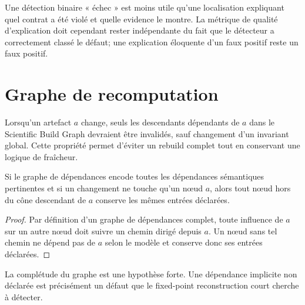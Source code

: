 Une détection binaire « échec » est moins utile qu'une localisation expliquant quel contrat a été violé et quelle evidence le montre. La métrique de qualité d'explication doit cependant rester indépendante du fait que le détecteur a correctement classé le défaut; une explication éloquente d'un faux positif reste un faux positif.

\section{Graphe de recomputation}

Lorsqu'un artefact $a$ change, seuls les descendants dépendants de $a$ dans le Scientific Build Graph devraient être invalidés, sauf changement d'un invariant global. Cette propriété permet d'éviter un rebuild complet tout en conservant une logique de fraîcheur.

\begin{proposition}
Si le graphe de dépendances encode toutes les dépendances sémantiques pertinentes et si un changement ne touche qu'un nœud $a$, alors tout nœud hors du cône descendant de $a$ conserve les mêmes entrées déclarées.
\end{proposition}

\begin{proof}
Par définition d'un graphe de dépendances complet, toute influence de $a$ sur un autre nœud doit suivre un chemin dirigé depuis $a$. Un nœud sans tel chemin ne dépend pas de $a$ selon le modèle et conserve donc ses entrées déclarées.
\end{proof}

\begin{limitation}
La complétude du graphe est une hypothèse forte. Une dépendance implicite non déclarée est précisément un défaut que le fixed-point reconstruction court cherche à détecter.
\end{limitation}

